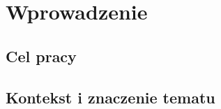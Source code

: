 \chapter{Wprowadzenie}
	\justify
	\section{Cel pracy}
		\pagebreak
	\section{Kontekst i znaczenie tematu}
		\pagebreak